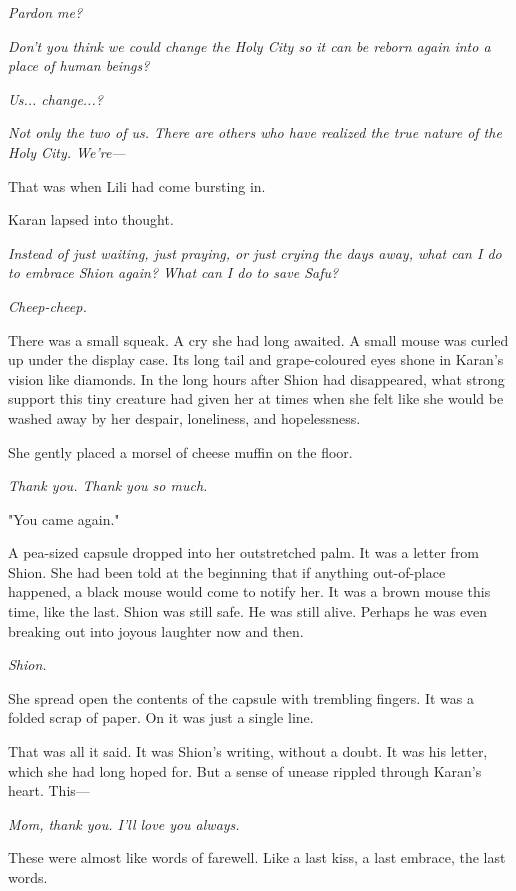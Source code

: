 \emph{Pardon me?}

\emph{Don't you think we could change the Holy City so it can be reborn
again into a place of human beings?}

\emph{Us... change...?}

\emph{Not only the two of us. There are others who have realized the
true nature of the Holy City. We're---}

That was when Lili had come bursting in.

Karan lapsed into thought.

\emph{Instead of just waiting, just praying, or just crying the days
away, what can I do to embrace Shion again? What can I do to save Safu?}

\emph{Cheep-cheep.}

There was a small squeak. A cry she had long awaited. A small mouse was
curled up under the display case. Its long tail and grape-coloured eyes
shone in Karan's vision like diamonds. In the long hours after Shion had
disappeared, what strong support this tiny creature had given her at
times when she felt like she would be washed away by her despair,
loneliness, and hopelessness.

She gently placed a morsel of cheese muffin on the floor.

\emph{Thank you. Thank you so much.}

"You came again."

A pea-sized capsule dropped into her outstretched palm. It was a letter
from Shion. She had been told at the beginning that if anything
out-of-place happened, a black mouse would come to notify her. It was a
brown mouse this time, like the last. Shion was still safe. He was still
alive. Perhaps he was even breaking out into joyous laughter now and
then.

\emph{Shion.}

She spread open the contents of the capsule with trembling fingers. It
was a folded scrap of paper. On it was just a single line.


That was all it said. It was Shion's writing, without a doubt. It was
his letter, which she had long hoped for. But a sense of unease rippled
through Karan's heart. This---

\emph{Mom, thank you. I'll love you always.}

These were almost like words of farewell. Like a last kiss, a last
embrace, the last words.

